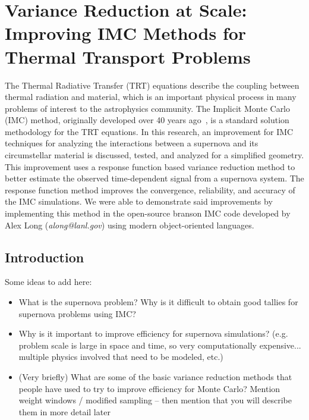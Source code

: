 \chapter{Variance Reduction at Scale: Improving IMC Methods for Thermal Transport Problems}


\begin{chapabstract}
The Thermal Radiative Transfer (TRT) equations describe the coupling between thermal radiation and material, which is an important physical process in many problems of interest to the astrophysics community. The Implicit Monte Carlo (IMC) method, originally developed over 40 years ago~\cite{FC71}, is a standard solution methodology for the TRT equations. In this research, an improvement for IMC techniques for analyzing the interactions between a supernova and its circumstellar material is discussed, tested, and analyzed for a simplified geometry. This improvement uses a response function based variance reduction method to better estimate the observed time-dependent signal from a supernova system. The response function method improves the convergence, reliability, and accuracy of the IMC simulations. We were able to demonstrate said improvements by implementing this method in the open-source branson IMC code developed by Alex Long (\textit{along@lanl.gov}) using modern object-oriented languages.
\end{chapabstract}


\section{Introduction}
Some ideas to add here:
\begin{itemize}
	\item What is the supernova problem? Why is it difficult to obtain good tallies for supernova problems using IMC?
	\item Why is it important to improve efficiency for supernova simulations? (e.g. problem scale is large in space and time, so very computationally expensive... multiple physics involved that need to be modeled, etc.)
	\item (Very briefly) What are some of the basic variance reduction methods that people have used to try to improve efficiency for Monte Carlo? Mention weight windows / modified sampling -- then mention that you will describe them in more detail later
\end{itemize}

